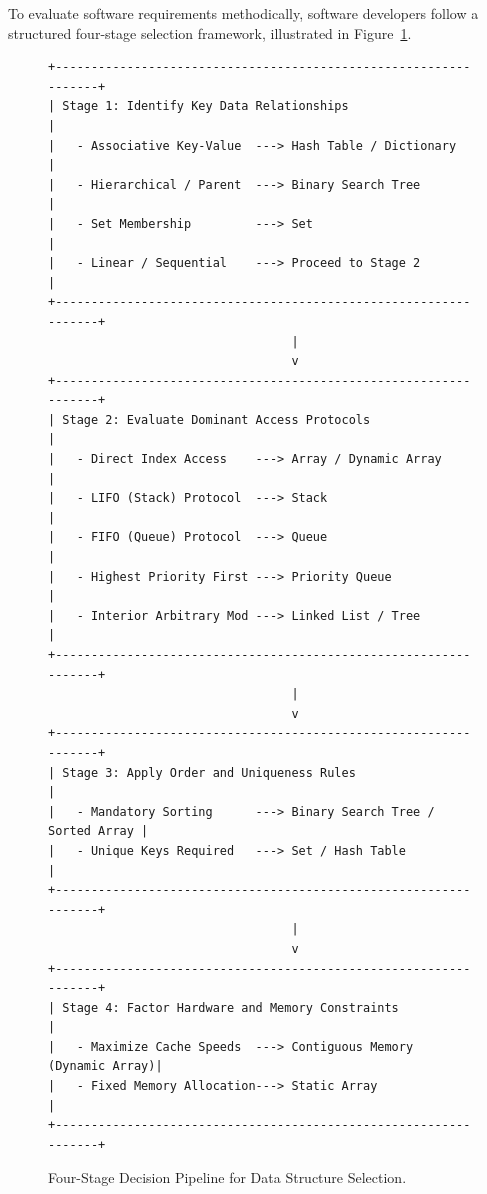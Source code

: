 \documentclass[12pt]{report}
\begin{document}
To evaluate software requirements methodically, software developers follow a structured four-stage selection framework, illustrated in Figure~\ref{fig:selection_pipeline}.

\begin{figure}[htbp]
\centering
\begin{verbatim}
+-----------------------------------------------------------------+
| Stage 1: Identify Key Data Relationships                        |
|   - Associative Key-Value  ---> Hash Table / Dictionary         |
|   - Hierarchical / Parent  ---> Binary Search Tree              |
|   - Set Membership         ---> Set                             |
|   - Linear / Sequential    ---> Proceed to Stage 2              |
+-----------------------------------------------------------------+
                                  |
                                  v
+-----------------------------------------------------------------+
| Stage 2: Evaluate Dominant Access Protocols                     |
|   - Direct Index Access    ---> Array / Dynamic Array           |
|   - LIFO (Stack) Protocol  ---> Stack                           |
|   - FIFO (Queue) Protocol  ---> Queue                           |
|   - Highest Priority First ---> Priority Queue                  |
|   - Interior Arbitrary Mod ---> Linked List / Tree              |
+-----------------------------------------------------------------+
                                  |
                                  v
+-----------------------------------------------------------------+
| Stage 3: Apply Order and Uniqueness Rules                       |
|   - Mandatory Sorting      ---> Binary Search Tree / Sorted Array |
|   - Unique Keys Required   ---> Set / Hash Table                |
+-----------------------------------------------------------------+
                                  |
                                  v
+-----------------------------------------------------------------+
| Stage 4: Factor Hardware and Memory Constraints                 |
|   - Maximize Cache Speeds  ---> Contiguous Memory (Dynamic Array)|
|   - Fixed Memory Allocation---> Static Array                    |
+-----------------------------------------------------------------+
\end{verbatim}
\caption{Four-Stage Decision Pipeline for Data Structure Selection.}
\label{fig:selection_pipeline}
\end{figure}
\end{document}
